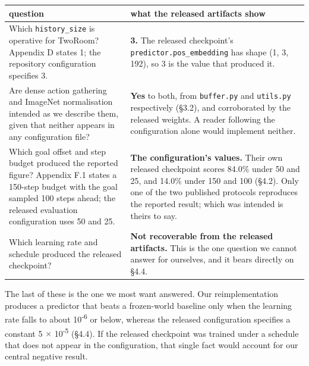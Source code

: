 \documentclass[10pt]{article}
\newcounter{none}
\begin{document}
{\def\LTcaptype{none} %
\begin{longtable}[]{@{}
  >{\raggedright\arraybackslash}p{}
  >{\raggedright\arraybackslash}p{}@{}}
\toprule\noalign{}
\begin{minipage}[b]{\linewidth}\raggedright
question
\end{minipage} & \begin{minipage}[b]{\linewidth}\raggedright
what the released artifacts show
\end{minipage} \\
\midrule\noalign{}
\endhead
\bottomrule\noalign{}
\endlastfoot
Which \texttt{history\_size} is operative for TwoRoom? Appendix D states 1; the repository configuration specifies 3. & \textbf{3.} The released checkpoint's \texttt{predictor.pos\_embedding} has shape (1, 3, 192), so 3 is the value that produced it. \\
Are dense action gathering and ImageNet normalisation intended as we describe them, given that neither appears in any configuration file? & \textbf{Yes} to both, from \texttt{buffer.py} and \texttt{utils.py} respectively (\S{}3.2), and corroborated by the released weights. A reader following the configuration alone would implement neither. \\
Which goal offset and step budget produced the reported figure? Appendix F.1 states a 150-step budget with the goal sampled 100 steps ahead; the released evaluation configuration uses 50 and 25. & \textbf{The configuration's values.} Their own released checkpoint scores 84.0\% under 50 and 25, and 14.0\% under 150 and 100 (\S{}4.2). Only one of the two published protocols reproduces the reported result; which was intended is theirs to say. \\
Which learning rate and schedule produced the released checkpoint? & \textbf{Not recoverable from the released artifacts.} This is the one question we cannot answer for ourselves, and it bears directly on \S{}4.4. \\
\end{longtable}
}

The last of these is the one we most want answered. Our reimplementation
produces a predictor that beats a frozen-world baseline only when the learning
rate falls to about 10\textsuperscript{-6} or below, whereas the released configuration specifies
a constant 5 $\times$ 10\textsuperscript{-5} (\S{}4.4). If the released checkpoint was trained under a
schedule that does not appear in the configuration, that single fact would
account for our central negative result.
\end{document}

